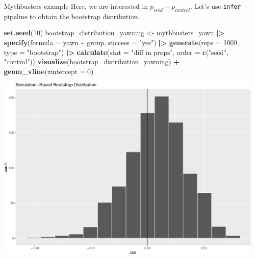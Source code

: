 \documentclass[
  ignorenonframetext,
]{beamer}
\newenvironment{Shaded}{\begin{snugshade}}{\end{snugshade}}
\newcommand{\AttributeTok}[1]{\textcolor[rgb]{0.13,0.29,0.53}{#1}}
\newcommand{\DecValTok}[1]{\textcolor[rgb]{0.00,0.00,0.81}{#1}}
\newcommand{\FunctionTok}[1]{\textcolor[rgb]{0.13,0.29,0.53}{\textbf{#1}}}
\newcommand{\NormalTok}[1]{#1}
\newcommand{\OtherTok}[1]{\textcolor[rgb]{0.56,0.35,0.01}{#1}}
\newcommand{\SpecialCharTok}[1]{\textcolor[rgb]{0.81,0.36,0.00}{\textbf{#1}}}
\newcommand{\StringTok}[1]{\textcolor[rgb]{0.31,0.60,0.02}{#1}}
\begin{document}
\begin{frame}[fragile]{Mythbusters example}
\protect\hypertarget{mythbusters-example-2}{}
Here, we are interested in \(p_{seed}-p_{control}\). Let's use
\texttt{infer} pipeline to obtain the bootstrap distribution.

\tiny

\begin{Shaded}
\begin{Highlighting}[]
\FunctionTok{set.seed}\NormalTok{(}\DecValTok{10}\NormalTok{)}
\NormalTok{bootstrap\_distribution\_yawning }\OtherTok{\textless{}{-}}\NormalTok{ mythbusters\_yawn }\SpecialCharTok{|\textgreater{}} 
  \FunctionTok{specify}\NormalTok{(}\AttributeTok{formula =}\NormalTok{ yawn }\SpecialCharTok{\textasciitilde{}}\NormalTok{ group, }\AttributeTok{success =} \StringTok{"yes"}\NormalTok{) }\SpecialCharTok{|\textgreater{}} 
  \FunctionTok{generate}\NormalTok{(}\AttributeTok{reps =} \DecValTok{1000}\NormalTok{, }\AttributeTok{type =} \StringTok{"bootstrap"}\NormalTok{) }\SpecialCharTok{|\textgreater{}} 
  \FunctionTok{calculate}\NormalTok{(}\AttributeTok{stat =} \StringTok{"diff in props"}\NormalTok{, }\AttributeTok{order =} \FunctionTok{c}\NormalTok{(}\StringTok{"seed"}\NormalTok{, }\StringTok{"control"}\NormalTok{))}
\FunctionTok{visualize}\NormalTok{(bootstrap\_distribution\_yawning) }\SpecialCharTok{+}
  \FunctionTok{geom\_vline}\NormalTok{(}\AttributeTok{xintercept =} \DecValTok{0}\NormalTok{)}
\end{Highlighting}
\end{Shaded}

\begin{center}\includegraphics[width=0.6\linewidth,height=0.4\textheight]{Week10_Lect_files/figure-beamer/unnamed-chunk-44-1} \end{center}
\normalsize
\end{frame}
\end{document}

